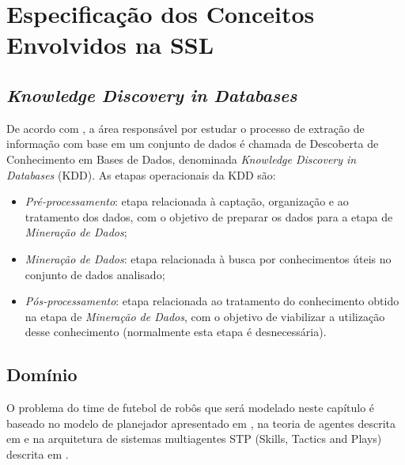 \chapter{Especificação dos Conceitos Envolvidos na SSL}\label{cap:def_problema}

\section{\textit{Knowledge Discovery in Databases}}

De acordo com \cite{passos2005datamining}, a área responsável por estudar o processo
de extração de informação com base em um conjunto de dados é chamada de Descoberta
de Conhecimento em Bases de Dados, denominada \textit{Knowledge Discovery in
Databases} (KDD). As etapas operacionais da KDD são:

\begin{itemize}
  \item \textit{Pré-processamento}: etapa relacionada à captação,
        organização e ao tratamento dos dados, com o objetivo de
        preparar os dados para a etapa de \textit{Mineração de Dados};
  \item \textit{Mineração de Dados}: etapa relacionada à busca por
        conhecimentos úteis no conjunto de dados analisado;
  \item \textit{Pós-processamento}: etapa relacionada ao tratamento do
        conhecimento obtido na etapa de \textit{Mineração de Dados}, com
        o objetivo de viabilizar a utilização desse conhecimento
        (normalmente esta etapa é desnecessária).
\end{itemize}


\section{Domínio}

O problema do time de futebol de robôs que será modelado neste capítulo é baseado
no modelo de planejador apresentado em \cite{zickler}, na teoria de agentes descrita
em \cite{russellnorvig} e na arquitetura de sistemas multiagentes
STP (Skills, Tactics and Plays) descrita em \cite{bowling2003plays}.




